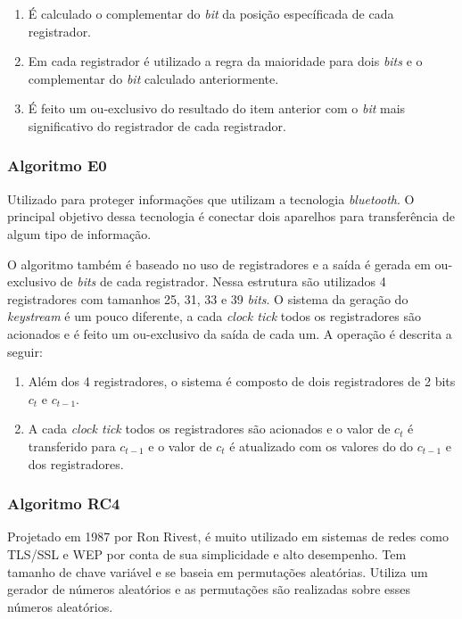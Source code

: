 \begin{enumerate}
	\item É calculado o complementar do \textit{bit} da posição específicada de cada registrador.
	\item Em cada registrador é utilizado a regra da maioridade para dois \textit{bits} e o complementar do \textit{bit} calculado anteriormente. 
	\item É feito um ou-exclusivo do resultado do item anterior com o \textit{bit} mais significativo do registrador de cada registrador.
\end{enumerate}

\subsubsection{Algoritmo E0}
\label{algorithm-e0}

Utilizado para proteger informações que utilizam a tecnologia \textit{bluetooth}. O principal objetivo dessa tecnologia é conectar dois aparelhos para transferência de algum tipo de informação.

O algoritmo também é baseado no uso de registradores e a saída é gerada em ou-exclusivo de \textit{bits} de cada registrador. Nessa estrutura são utilizados 4 registradores com tamanhos 25, 31, 33 e 39 \textit{bits}. O sistema da geração do \textit{keystream} é um pouco diferente, a cada \textit{clock tick} todos os registradores são acionados e é feito um ou-exclusivo da saída de cada um. A operação é descrita a seguir:

\begin{enumerate}
	\item Além dos 4 registradores, o sistema é composto de dois registradores de 2 bits $c_t$ e $c_{t-1}$.
	\item A cada \textit{clock tick} todos os registradores são acionados e o valor de $ c_t $ é transferido para $ c_{t-1}$ e o valor de $ c_t$ é atualizado com os valores do do $ c_{t-1}$ e dos registradores.
\end{enumerate}

\subsubsection{Algoritmo RC4}
\label{algorithm-rc4}

Projetado em 1987 por Ron Rivest, é muito utilizado em sistemas de redes como TLS/SSL e WEP por conta de sua simplicidade e alto desempenho. Tem tamanho de chave variável e se baseia em permutações aleatórias. Utiliza um gerador de números aleatórios e as permutações são realizadas sobre esses números aleatórios.

